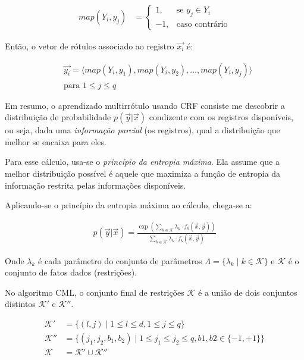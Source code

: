 \documentclass[runningheads,a4paper]{llncs}
\begin{document}
\begin{align*}
	map(Y_i, y_j) &= \begin{cases}
		1, & \text{se $y_j \in Y_i$} \\
		-1, & \text{caso contrário}
	\end{cases}
\end{align*}

Então, o vetor de rótulos associado ao registro $\vec{x_i}$ é:

\begin{align*}
&\vec{y_i} = \langle map(Y_i, y_1), map(Y_i, y_2), \dots, map(Y_i, y_j) \rangle \\
&\text{para } 1 \leq j \leq q  
\end{align*}

Em resumo, o aprendizado multirrótulo usando CRF consiste me descobrir a distribuição de probabilidade $p(\vec{y} | \vec{x})$ condizente com os registros disponíveis, ou seja, dada uma \textit{informação parcial} (os registros), qual a distribuição que melhor se encaixa para eles.

Para esse cálculo, usa-se o \textit{princípio da entropia máxima}. Ela assume que a melhor distribuição possível é aquele que maximiza a função de entropia da informação restrita pelas informações disponíveis.

Aplicando-se o princípio da entropia máxima ao cálculo, chega-se a:

\begin{align*}
p(\vec{y} | \vec{x}) = \frac{\exp \left( \sum_{k \in \mathcal{K}} \lambda_k \cdot f_k(\vec{x}, \vec{y}) \right)}{\sum_{k \in \mathcal{K}} \lambda_k \cdot f_k(\vec{x}, \vec{y})}
\end{align*}

Onde $\lambda_k$ é cada parâmetro do conjunto de parâmetros $\Lambda = \{ \lambda_k \mid k \in \mathcal{K} \}$ e $\mathcal{K}$ é o conjunto de fatos dados (restrições).

No algoritmo CML, o conjunto final de restrições $\mathcal{K}$ é a união de dois conjuntos distintos $\mathcal{K'}$ e $\mathcal{K''}$. 

\begin{align*}
	\mathcal{K'} &= \{ (l, j) \mid 1 \leq l \leq d, 1 \leq j \leq q \} \\
	\mathcal{K''} &= \{ (j_1, j_2, b_1, b_2) \mid 1 \leq j_1 \leq j_2 \leq q, b1, b2 \in \{ -1, +1 \} \} \\
	  \mathcal{K} &= \mathcal{K'} \cup \mathcal{K''}
\end{align*}
\end{document}
